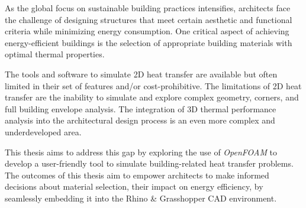 
\begin{summary}

As the global focus on sustainable building practices intensifies, architects face the challenge of designing structures that meet certain aesthetic and functional criteria while minimizing energy consumption. 
One critical aspect of achieving energy-efficient buildings is the selection of appropriate building materials with optimal thermal properties. 






The tools and software to simulate 2D heat transfer are available but often limited in their set of features and/or cost-prohibitive. The limitations of 2D heat transfer are the inability to simulate and explore complex geometry, corners, and full building envelope analysis.
The integration of 3D thermal performance analysis into the architectural design process is an even more complex and underdeveloped area. 


This thesis aims to address this gap by exploring the use of \textit{OpenFOAM} to develop a user-friendly tool to simulate building-related heat transfer problems.
The outcomes of this thesis aim to empower architects to make informed decisions about material selection, their impact on energy efficiency, by seamlessly embedding it into the Rhino \& Grasshopper CAD environment.

\end{summary} 